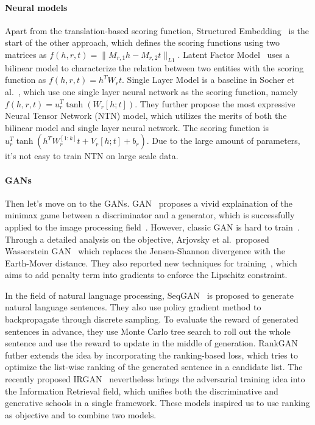 \documentclass[twocolumn,a4paper,10pt,review,5p]{elsarticle}
\begin{document}
\paragraph{Neural models} Apart from the translation-based scoring function, Structured Embedding~\cite{bordes2011structured_embedding} is the start of the other approach, which defines the scoring functions using two matrices as $f(h, r, t) = \lVert M_{r,1}h - M_{r,2}t \rVert_{L1}$. Latent Factor Model~\cite{jenatton2012bilinear} uses a bilinear model to characterize the relation between two entities with the scoring function as $f(h, r, t) = h^T W_r t$.
Single Layer Model is a baseline in Socher et al.~\cite{NTN}, which use one single layer neural network as the scoring function, namely $f(h, r, t)=u_r^T \tanh(W_r[h;t])$. They further propose the most expressive Neural Tensor Network (NTN) model, which utilizes the merits of both the bilinear model and single layer neural network. The scoring function is $u_r^T \tanh(h^T W_r^{[1:k]}t + V_r[h;t] + b_r)$. Due to the large amount of parameters, it's not easy to train NTN on large scale data.

\paragraph{GANs} Then let's move on to the GANs. GAN~\cite{GAN} proposes a vivid explaination of the minimax game between a discriminator and a generator, which is successfully applied to the image processing field~\cite{Ledig_2017_CVPR}. However, classic GAN is hard to train~\cite{Salimans_2016}. Through a detailed analysis on the objective, Arjovsky et al.\ proposed Wasserstein GAN~\cite{Arjovsky2017WGAN} which replaces the Jensen-Shannon divergence with the Earth-Mover distance. They also reported new techniques for training~\cite{Gulrajani2017LipschitzReg}, which aims to add penalty term into gradients to enforce the Lipschitz constraint.

In the field of natural language processing, SeqGAN~\cite{SeqGAN} is proposed to generate natural language sentences. They also use policy gradient method to backpropagate through discrete sampling. To evaluate the reward of generated sentences in advance, they use Monte Carlo tree search to roll out the whole sentence and use the reward to update in the middle of generation. RankGAN~\cite{RankGAN} futher extends the idea by incorporating the ranking-based loss, which tries to optimize the list-wise ranking of the generated sentence in a candidate list. The recently proposed IRGAN~\cite{IRGAN} nevertheless brings the adversarial training idea into the Information Retrieval field, which unifies both the discriminative and generative schools in a single framework. These models inspired us to use ranking as objective and to combine two models.
\end{document}
